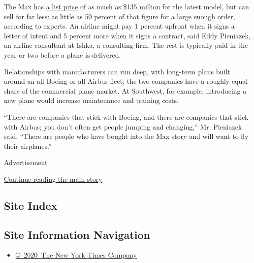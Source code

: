 The Max has \href{https://www.boeing.com/company/about-bca/}{a list
price} of as much as \$135 million for the latest model, but can sell
for far less: as little as 50 percent of that figure for a large enough
order, according to experts. An airline might pay 1 percent upfront when
it signs a letter of intent and 5 percent more when it signs a contract,
said Eddy Pieniazek, an airline consultant at Ishka, a consulting firm.
The rest is typically paid in the year or two before a plane is
delivered.

Relationships with manufacturers can run deep, with long-term plans
built around an all-Boeing or all-Airbus fleet; the two companies have a
roughly equal share of the commercial plane market. At Southwest, for
example, introducing a new plane would increase maintenance and training
costs.

``There are companies that stick with Boeing, and there are companies
that stick with Airbus; you don't often get people jumping and
changing,'' Mr. Pieniazek said. ``There are people who have bought into
the Max story and will want to fly their airplanes.''

Advertisement

\protect\hyperlink{after-bottom}{Continue reading the main story}

\hypertarget{site-index}{%
\subsection{Site Index}\label{site-index}}

\hypertarget{site-information-navigation}{%
\subsection{Site Information
Navigation}\label{site-information-navigation}}

\begin{itemize}
\tightlist
\item
  \href{https://help.nytimes3xbfgragh.onion/hc/en-us/articles/115014792127-Copyright-notice}{©~2020~The
  New York Times Company}
\end{itemize}

